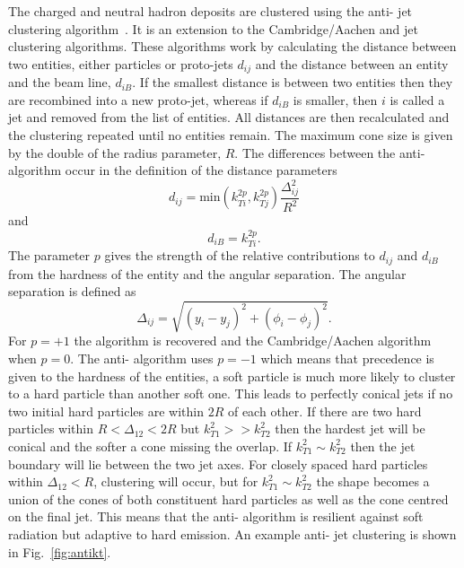 The charged and neutral hadron deposits are clustered using the anti-\kt{} jet clustering algorithm~\cite{Event:antikt}.
It is an extension to the Cambridge/Aachen and \kt{} jet clustering algorithms.
These algorithms work by calculating the distance between two entities, either particles or proto-jets $d_{ij}$ and the distance between an entity and the beam line, $d_{iB}$.
If the smallest distance is between two entities then they are recombined into a new proto-jet, whereas if $d_{iB}$ is smaller, then $i$ is called a jet and removed from the list of entities.
All distances are then recalculated and the clustering repeated until no entities remain.
The maximum cone size is given by the double of the radius parameter, $R$.
The differences between the anti-\kt{} algorithm occur in the definition of the distance parameters
\begin{equation}
	d_{ij} = \mathrm{min}(k_{Ti}^{2p},k_{Tj}^{2p})\frac{\Delta^{2}_{ij}}{R^{2}}
\end{equation}
and
\begin{equation}
	d_{iB} = k_{Ti}^{2p}.
\end{equation}
The parameter $p$ gives the strength of the relative contributions to $d_{ij}$ and $d_{iB}$ from the hardness of the entity and the angular separation.
The angular separation is defined as 
\begin{equation*}
	\Delta_{ij}=\sqrt{(y_i-y_j)^2+(\phi_i-\phi_j)^2}.	
\end{equation*}
For $p=+1$ the \kt{} algorithm is recovered and the Cambridge/Aachen algorithm when $p=0$.
The anti-\kt{} algorithm uses $p=-1$ which means that precedence is given to the hardness of the entities, \eg{} a soft particle is much more likely to cluster to a hard particle than another soft one.
This leads to perfectly conical jets if no two initial hard particles are within $2R$ of each other.
If there are two hard particles within $R<\Delta_{12}<2R$ but $k_{T1}^{2}>>k_{T2}^{2}$ then the hardest jet will be conical and the softer a cone missing the overlap.
If $k_{T1}^{2}\sim k_{T2}^{2}$ then the jet boundary will lie between the two jet axes.
For closely spaced hard particles within $\Delta_{12}<R$, clustering will occur, but for $k_{T1}^{2}\sim k_{T2}^{2}$ the shape becomes a union of the cones of both constituent hard particles as well as the cone centred on the final jet.
This means that the anti-\kt{} algorithm is resilient against soft radiation but adaptive to hard emission.
An example anti-\kt{} jet clustering is shown in Fig.~\ref{fig:antikt}.
